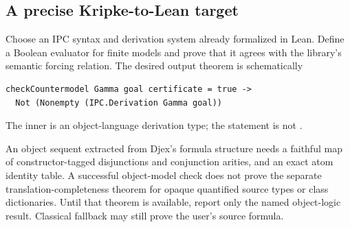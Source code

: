 \subsection{A precise Kripke-to-Lean target}
Choose an IPC syntax and derivation system already formalized in Lean. Define a
Boolean evaluator for finite models and prove that it agrees with the library's
semantic forcing relation. The desired output theorem is schematically
\begin{lstlisting}
checkCountermodel Gamma goal certificate = true ->
  Not (Nonempty (IPC.Derivation Gamma goal))
\end{lstlisting}
The inner  is an object-language derivation type; the
statement is not .

An object sequent extracted from Djex's formula structure needs a faithful map
of constructor-tagged disjunctions and conjunction arities, and an exact atom
identity table. A successful object-model check does not prove the separate
translation-completeness theorem for opaque quantified source types or
class dictionaries. Until that theorem is available, report only the named
object-logic result. Classical fallback may still prove the user's source
formula.
